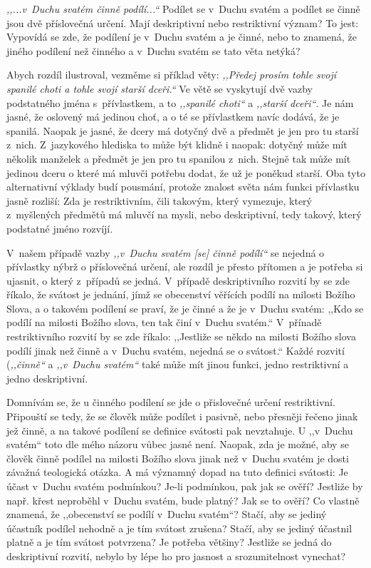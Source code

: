 \textit{,,...v~Duchu svatém činně podílí...``} Podílet se v~Duchu svatém a
podílet se činně jsou dvě příslovečná určení. Mají deskriptivní nebo
restriktivní význam? To jest: Vypovídá se zde, že podílení je v~Duchu svatém a
je činné, nebo to znamená, že jiného podílení než činného a v~Duchu svatém se
tato věta netýká?

Abych rozdíl ilustroval, vezměme si příklad věty: \textit{,,Předej prosím tohle
svojí spanilé choti a tohle svojí starší dceři.``} Ve větě se vyskytují dvě
vazby podstatného jména s~přívlastkem, a to \textit{,,spanilé choti``} a
\textit{,,starší dceři``}. Je nám jasné, že oslovený má jedinou choť, a o té se
přívlastkem navíc dodává, že je spanilá. Naopak je jasné, že dcery má dotyčný
dvě a předmět je jen pro tu starší z~nich. Z~jazykového hlediska to může být
klidně i naopak: dotyčný může mít několik manželek a předmět je jen pro tu
spanilou z~nich. Stejně tak může mít jedinou dceru o které má mluvči potřebu
dodat, že už je poněkud starší. Oba tyto alternativní výklady budí pousmání,
protože znalost světa nám funkci přívlastku jasně rozliší: Zda je restriktivním,
čili takovým, který vymezuje, který z~myšlených předmětů má mluvčí na mysli,
nebo deskriptivní, tedy takový, který podstatné jméno rozvíjí.

V~našem případě vazby \textit{,,v~Duchu svatém [se] činně podílí``} se nejedná o
přívlastky nýbrž o příslovečná určení, ale rozdíl je přesto přítomen a je
potřeba si ujasnit, o který z~případů se jedná. V~případě deskriptivního rozvití
by se zde říkalo, že svátost je jednání, jímž se obecenství věřících
podílí na milosti Božího Slova, a o takovém podílení se praví, že je činné a že
je v~Duchu svatém: ,,Kdo se podílí na milosti Božího slova, ten tak činí v~Duchu
svatém.`` V~přínadě restriktivního rozvití by se zde říkalo: ,,Jestliže se někdo
na milosti Božího slova podílí jinak než činně a v~Duchu svatém, nejedná se o
svátost.``
Každé rozvití (\textit{,,činně``} a \textit{,,v~Duchu svatém``} také může mít
jinou funkci, jedno restriktivní a jedno deskriptivní.

Domnívám se, že u činného podílení se jde o přislovečné určení restriktivní.
Připouští se tedy, že se člověk může podílet i pasivně, nebo přesněji řečeno
jinak jež činně, a na takové podílení se definice svátosti pak nevztahuje. U
,,v~Duchu svatém``  toto dle mého názoru vůbec jasné není. Naopak, zda je možné,
aby se člověk činně podílel na milosti Božího slova jinak než v~Duchu svatém je
dosti závažná teologická otázka. A má významný dopad na tuto definici svátosti:
Je účast v~Duchu svatém podmínkou? Je-li podmínkou, pak jak se ověří? Jestliže
by např. křest neproběhl v~Duchu svatém, bude platný? Jak se to ověří? Co
vlastně znamená, že ,,obecenství se podílí v~Duchu svatém``? Stačí, aby se
jediný účastník podílel nehodně a je tím svátost zrušena? Stačí, aby se jediný
účastnil platně a je tím svátost potvrzena? Je potřeba většiny? Jestliže se
jedná do deskriptivní rozvití, nebylo by lépe ho pro jasnost a srozumitelnost
vynechat?


